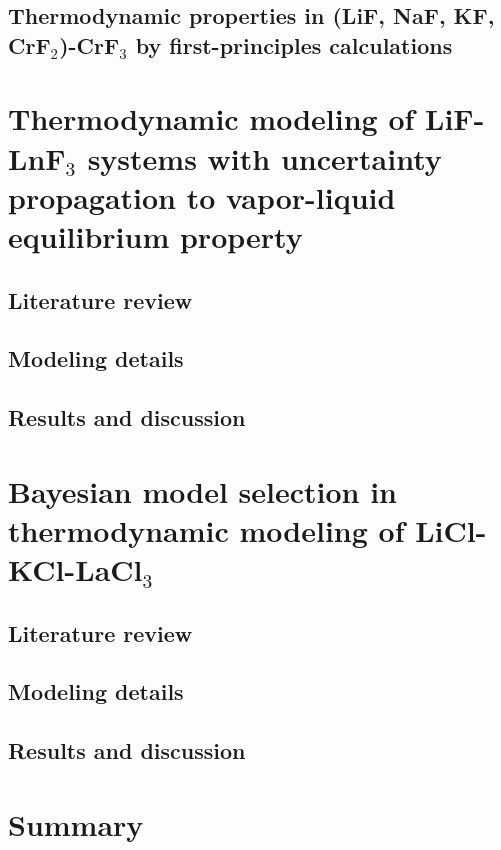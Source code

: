 \subsection{Thermodynamic properties in (LiF, NaF, KF, CrF$_2$)-CrF$_3$ by first-principles calculations} \label{moltensalts:ssec:FLiNaKCrsolids}





\section{Thermodynamic modeling of LiF-LnF${_3}$ systems with uncertainty propagation to vapor-liquid equilibrium property} \label{moltensalts:sec:LiFLnF3}

\subsection{Literature review} \label{moltensalts:ssec:LiFLnF3lit}


\subsection{Modeling details} \label{moltensalts:ssec:LiFLnF3model}


\subsection{Results and discussion} \label{moltensalts:ssec:LiFLnF3result}


\section{Bayesian model selection in thermodynamic modeling of LiCl-KCl-LaCl${_3}$} \label{moltensalts:sec:LaCl3}

\subsection{Literature review} \label{moltensalts:ssec:LaCl3lit}


\subsection{Modeling details} \label{moltensalts:ssec:LaCl3model}


    \subsection{Results and discussion} \label{moltensalts:ssec:LaCl3result}


\section{Summary} \label{moltensalts:sec:Summary}
